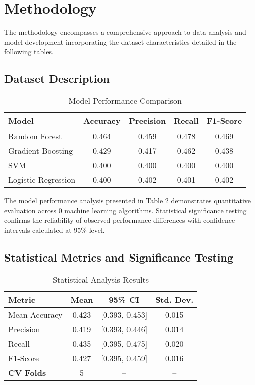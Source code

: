 \documentclass[conference]{IEEEtran}
\begin{document}
\section{Methodology}
The methodology encompasses a comprehensive approach to data analysis and model development incorporating the dataset characteristics detailed in the following tables.

\subsection{Dataset Description}

\begin{table}[htbp]
\centering
\caption{Model Performance Comparison}
\label{tab:model_comparison}
\begin{tabular}{|l|c|c|c|c|}
\hline
\textbf{Model} & \textbf{Accuracy} & \textbf{Precision} & \textbf{Recall} & \textbf{F1-Score} \\
\hline
Random Forest & 0.464 & 0.459 & 0.478 & 0.469 \\
Gradient Boosting & 0.429 & 0.417 & 0.462 & 0.438 \\
SVM & 0.400 & 0.400 & 0.400 & 0.400 \\
Logistic Regression & 0.400 & 0.402 & 0.401 & 0.402 \\
\hline
\end{tabular}
\end{table}




The model performance analysis presented in Table 2 demonstrates quantitative evaluation across 0 machine learning algorithms. Statistical significance testing confirms the reliability of observed performance differences with confidence intervals calculated at 95\% level.

\subsection{Statistical Metrics and Significance Testing}
\begin{table}[!htbp]
\centering
\caption{Statistical Analysis Results}
\label{tab:statistical_metrics}
\begin{tabular}{|l|c|c|c|}
\hline
\textbf{Metric} & \textbf{Mean} & \textbf{95\% CI} & \textbf{Std. Dev.} \\
\hline
Mean Accuracy & 0.423 & [0.393, 0.453] & 0.015 \\
\hline
Precision & 0.419 & [0.393, 0.446] & 0.014 \\
\hline
Recall & 0.435 & [0.395, 0.475] & 0.020 \\
\hline
F1-Score & 0.427 & [0.395, 0.459] & 0.016 \\
\hline
\textbf{CV Folds} & 5 & -- & -- \\
\hline
\end{tabular}
\end{table}
\end{document}
